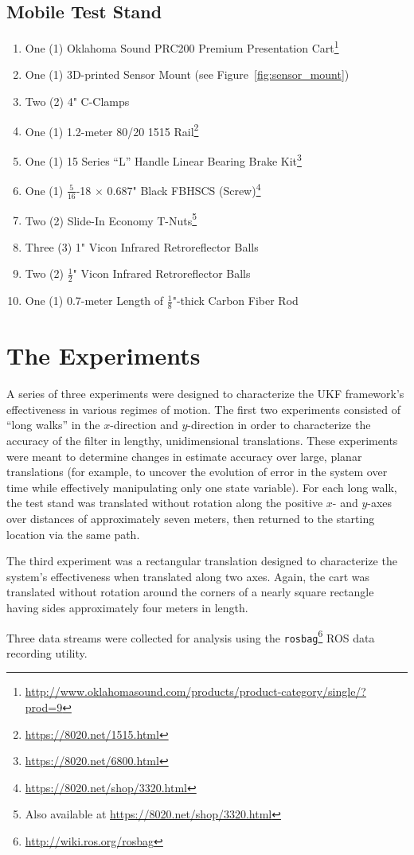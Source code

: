 \subsection{Mobile Test Stand}
\begin{enumerate}
\item One (1) Oklahoma Sound PRC200 Premium Presentation Cart\footnote{\url{http://www.oklahomasound.com/products/product-category/single/?prod=9}}
\item One (1) 3D-printed Sensor Mount (see Figure~\ref{fig:sensor_mount})
\item Two (2) 4" C-Clamps
\item One (1) 1.2-meter 80/20 1515 Rail\footnote{\url{https://8020.net/1515.html}}
\item One (1) 15 Series ``L'' Handle Linear Bearing Brake Kit\footnote{\url{https://8020.net/6800.html}}
\item One (1) $\frac{5}{16}$-18 $\times$ 0.687" Black FBHSCS (Screw)\footnote{\url{https://8020.net/shop/3320.html}}
\item Two (2) Slide-In Economy T-Nuts\footnote{Also available at \url{https://8020.net/shop/3320.html}}
\item Three (3) 1" Vicon Infrared Retroreflector Balls
\item Two (2) $\frac{1}{2}$" Vicon Infrared Retroreflector Balls
\item One (1) 0.7-meter Length of $\frac{1}{8}$"-thick Carbon Fiber Rod
\end{enumerate}


\section{The Experiments}

A series of three experiments were designed to characterize the UKF framework's effectiveness in various regimes of motion. The first two experiments consisted of ``long walks'' in the $x$-direction and $y$-direction in order to characterize the accuracy of the filter in lengthy, unidimensional translations. These experiments were meant to determine changes in estimate accuracy over large, planar translations (for example, to uncover the evolution of error in the system over time while effectively manipulating only one state variable). For each long walk, the test stand was translated without rotation along the positive $x$- and $y$-axes over distances of approximately seven meters, then returned to the starting location via the same path.

The third experiment was a rectangular translation designed to characterize the system's effectiveness when translated along two axes. Again, the cart was translated without rotation around the corners of a nearly square rectangle having sides approximately four meters in length.

Three data streams were collected for analysis using the \texttt{rosbag}\footnote{\url{http://wiki.ros.org/rosbag}} ROS data recording utility.

